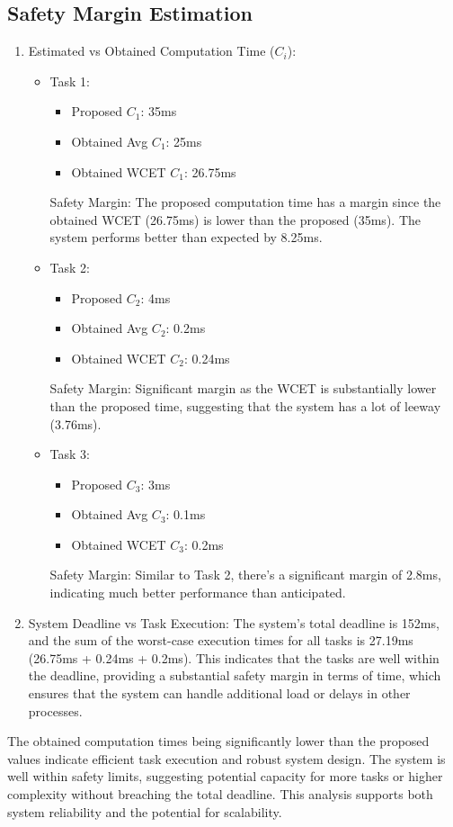 \documentclass[a4paper,11pt]{article}%
\begin{document}
\subsection{Safety Margin Estimation}
\begin{enumerate}
\item Estimated vs Obtained Computation Time ($C_i$):
\begin{itemize}
\item Task 1:
\begin{itemize}
\item Proposed $C_1$: 35ms
\item Obtained Avg $C_1$: 25ms
\item Obtained WCET $C_1$: 26.75ms
\end{itemize}
Safety Margin: The proposed computation time has a margin since the obtained WCET (26.75ms) is lower than the proposed (35ms). The system performs better than expected by 8.25ms.
\item Task 2:
\begin{itemize}
\item Proposed $C_2$: 4ms
\item Obtained Avg $C_2$: 0.2ms
\item Obtained WCET $C_2$: 0.24ms
\end{itemize}
Safety Margin: Significant margin as the WCET is substantially lower than the proposed time, suggesting that the system has a lot of leeway (3.76ms).
\item Task 3:
\begin{itemize}
\item Proposed $C_3$: 3ms
\item Obtained Avg $C_3$: 0.1ms
\item Obtained WCET $C_3$: 0.2ms
\end{itemize}
Safety Margin: Similar to Task 2, there's a significant margin of 2.8ms, indicating much better performance than anticipated.
\end{itemize}
\item System Deadline vs Task Execution: The system's total deadline is 152ms, and the sum of the worst-case execution times for all tasks is 27.19ms (26.75ms + 0.24ms + 0.2ms). This indicates that the tasks are well within the deadline, providing a substantial safety margin in terms of time, which ensures that the system can handle additional load or delays in other processes.
\end{enumerate}
The obtained computation times being significantly lower than the proposed values indicate efficient task execution and robust system design. The system is well within safety limits, suggesting potential capacity for more tasks or higher complexity without breaching the total deadline. This analysis supports both system reliability and the potential for scalability.
\end{document}
